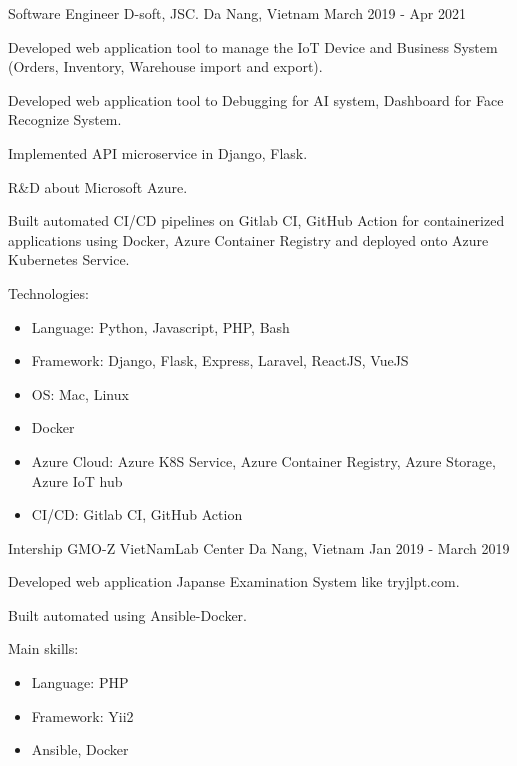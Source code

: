 \begin{cventries}
    \cventry
    {Software Engineer} %
    {D-soft, JSC.} %
    {Da Nang, Vietnam} %
    {March 2019 - Apr 2021} %
    {
      \begin{cvitems} %
        \item {Developed web application tool to manage the IoT Device and Business System (Orders, Inventory, Warehouse import and export).}
        \item {Developed web application tool to Debugging for AI system, Dashboard for Face Recognize System.}
        \item {Implemented API microservice in Django, Flask.}
        \item {R\&D about Microsoft Azure.}
        \item {Built automated CI/CD pipelines on Gitlab CI, GitHub Action for containerized applications using Docker, Azure Container Registry and deployed onto Azure Kubernetes Service.}
        \item {Technologies:
            \begin{itemize}
                \item {Language: Python, Javascript, PHP, Bash}
                \item {Framework: Django, Flask, Express, Laravel, ReactJS, VueJS}
                \item {OS: Mac, Linux}
                \item {Docker}
                \item {Azure Cloud: Azure K8S Service, Azure Container Registry, Azure Storage, Azure IoT hub}
                \item {CI/CD: Gitlab CI, GitHub Action}
            \end{itemize}
        }
      \end{cvitems}
    }

    \cventry
    {Intership} %
    {GMO-Z VietNamLab Center} %
    {Da Nang, Vietnam} %
    {Jan 2019 - March 2019} %
    {
      \begin{cvitems} %
        \item {Developed web application Japanse Examination System like tryjlpt.com.}
        \item {Built automated using Ansible-Docker.}
        \item {Main skills:
            \begin{itemize}
                \item {Language: PHP}
                \item {Framework: Yii2}
                \item {Ansible, Docker}
            \end{itemize}
        }
      \end{cvitems}
    }

\end{cventries}

